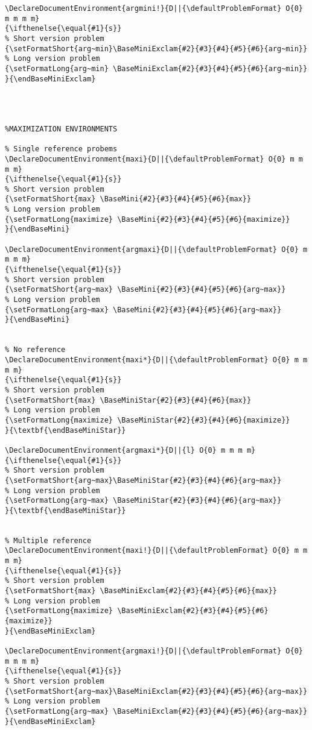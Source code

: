 \documentclass[a4paper]{article}
\begin{document}
\begin{lstlisting}
\DeclareDocumentEnvironment{argmini!}{D||{\defaultProblemFormat} O{0} m m m m}
{\ifthenelse{\equal{#1}{s}}
% Short version problem
{\setFormatShort{arg~min}\BaseMiniExclam{#2}{#3}{#4}{#5}{#6}{arg~min}}
% Long version problem	
{\setFormatLong{arg~min} \BaseMiniExclam{#2}{#3}{#4}{#5}{#6}{arg~min}}
}{\endBaseMiniExclam}




%MAXIMIZATION ENVIRONMENTS

% Single reference probems
\DeclareDocumentEnvironment{maxi}{D||{\defaultProblemFormat} O{0} m m m m}
{\ifthenelse{\equal{#1}{s}}
% Short version problem
{\setFormatShort{max} \BaseMini{#2}{#3}{#4}{#5}{#6}{max}}
% Long version problem	
{\setFormatLong{maximize} \BaseMini{#2}{#3}{#4}{#5}{#6}{maximize}}
}{\endBaseMini}

\DeclareDocumentEnvironment{argmaxi}{D||{\defaultProblemFormat} O{0} m m m m}
{\ifthenelse{\equal{#1}{s}}
% Short version problem
{\setFormatShort{arg~max} \BaseMini{#2}{#3}{#4}{#5}{#6}{arg~max}}
% Long version problem	
{\setFormatLong{arg~max} \BaseMini{#2}{#3}{#4}{#5}{#6}{arg~max}}
}{\endBaseMini}


% No reference
\DeclareDocumentEnvironment{maxi*}{D||{\defaultProblemFormat} O{0} m m m m}
{\ifthenelse{\equal{#1}{s}}
% Short version problem
{\setFormatShort{max} \BaseMiniStar{#2}{#3}{#4}{#6}{max}}
% Long version problem	
{\setFormatLong{maximize} \BaseMiniStar{#2}{#3}{#4}{#6}{maximize}}
}{\textbf{\endBaseMiniStar}}

\DeclareDocumentEnvironment{argmaxi*}{D||{l} O{0} m m m m}
{\ifthenelse{\equal{#1}{s}}
% Short version problem
{\setFormatShort{arg~max}\BaseMiniStar{#2}{#3}{#4}{#6}{arg~max}}
% Long version problem	
{\setFormatLong{arg~max} \BaseMiniStar{#2}{#3}{#4}{#6}{arg~max}}
}{\textbf{\endBaseMiniStar}}


% Multiple reference
\DeclareDocumentEnvironment{maxi!}{D||{\defaultProblemFormat} O{0} m m m m}
{\ifthenelse{\equal{#1}{s}}
% Short version problem
{\setFormatShort{max} \BaseMiniExclam{#2}{#3}{#4}{#5}{#6}{max}}
% Long version problem	
{\setFormatLong{maximize} \BaseMiniExclam{#2}{#3}{#4}{#5}{#6}{maximize}}
}{\endBaseMiniExclam}

\DeclareDocumentEnvironment{argmaxi!}{D||{\defaultProblemFormat} O{0} m m m m}
{\ifthenelse{\equal{#1}{s}}
% Short version problem
{\setFormatShort{arg~max}\BaseMiniExclam{#2}{#3}{#4}{#5}{#6}{arg~max}}
% Long version problem	
{\setFormatLong{arg~max} \BaseMiniExclam{#2}{#3}{#4}{#5}{#6}{arg~max}}
}{\endBaseMiniExclam}
\end{lstlisting}
\end{document}
